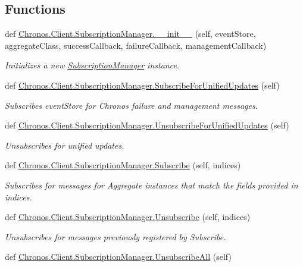\subsection*{Functions}
\begin{DoxyCompactItemize}
\item 
def \hyperlink{group__Chronos_ga17b0ece7d5be132801d46977ffac3bcc}{Chronos.\+Client.\+Subscription\+Manager.\+\_\+\+\_\+init\+\_\+\+\_\+} (self, event\+Store, aggregate\+Class, success\+Callback, failure\+Callback, management\+Callback)
\begin{DoxyCompactList}\small\item\em Initializes a new \hyperlink{classChronos_1_1Client_1_1SubscriptionManager}{Subscription\+Manager} instance. \end{DoxyCompactList}\item 
def \hyperlink{group__Chronos_gae21ba8cca5cb7ffe3085e39b9ef18945}{Chronos.\+Client.\+Subscription\+Manager.\+Subscribe\+For\+Unified\+Updates} (self)
\begin{DoxyCompactList}\small\item\em Subscribes {\ttfamily event\+Store} for Chronos failure and management messages. \end{DoxyCompactList}\item 
def \hyperlink{group__Chronos_ga4d1b5c99ac9d282cd4a5b39f5ace3615}{Chronos.\+Client.\+Subscription\+Manager.\+Unsubscribe\+For\+Unified\+Updates} (self)
\begin{DoxyCompactList}\small\item\em Unsubscribes for unified updates. \end{DoxyCompactList}\item 
def \hyperlink{group__Chronos_ga83af8c47b1d510ea2aa638680b9304ed}{Chronos.\+Client.\+Subscription\+Manager.\+Subscribe} (self, indices)
\begin{DoxyCompactList}\small\item\em Subscribes for messages for Aggregate instances that match the fields provided in {\ttfamily indices}. \end{DoxyCompactList}\item 
def \hyperlink{group__Chronos_ga115103720707b543e309432166332e1d}{Chronos.\+Client.\+Subscription\+Manager.\+Unsubscribe} (self, indices)
\begin{DoxyCompactList}\small\item\em Unsubscribes for messages previously registered by Subscribe. \end{DoxyCompactList}\item 
def \hyperlink{group__Chronos_gaef0709e91993c04a0e27eb158e4e8514}{Chronos.\+Client.\+Subscription\+Manager.\+Unsubscribe\+All} (self)\hypertarget{group__Chronos_gaef0709e91993c04a0e27eb158e4e8514}{}\label{group__Chronos_gaef0709e91993c04a0e27eb158e4e8514}


\end{DoxyCompactItemize}
